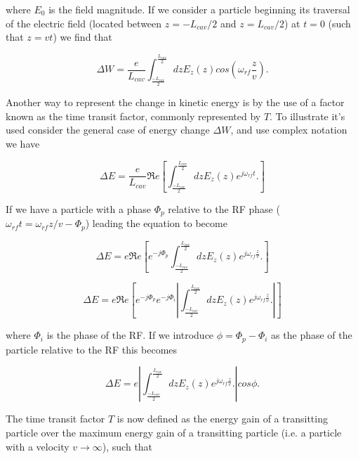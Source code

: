 where $E_{0}$ is the field magnitude. If we consider a particle beginning its traversal of the electric field (located between $z=-L_{cav}/2$ and $z=L_{cav}/2$) at $t=0$ (such that $z=vt$) we find that

\begin{equation}
\Delta W = \frac{e}{L_{cav}} \int^{\frac{L_{cav}}{2}}_{\frac{-L_{cav}}{2}} dz E_{z}\left( z \right) cos \left( \omega_{rf} \frac{z}{v} \right).
\end{equation}

Another way to represent the change in kinetic energy is by the use of a factor known as the time transit factor, commonly represented by $T$. To illustrate it's used consider the general case of energy change $\Delta W$, and use complex notation we have

\begin{equation}
\Delta E = \frac{e}{L_{cav}} \Re{}e \left[ \int^{\frac{L_{cav}}{2}}_{\frac{-L_{cav}}{2}} dz E_{z}\left( z \right)e^{j \omega_{rf} t}.\right]
\end{equation}

If we have a particle with a phase $\Phi_{p}$ relative to the RF phase ($\omega_{rf}t = \omega_{rf}z/v - \Phi_{p}$) leading the equation to become

\begin{equation}
\Delta E = e \Re{}e \left[ e^{-j \Phi_{p}}\int^{\frac{L_{cav}}{2}}_{\frac{-L_{cav}}{2}} dz E_{z}\left( z \right) e^{j \omega_{rf} \frac{z}{v}}.\right]
\end{equation}

\begin{equation}
\Delta E = e \Re{}e \left[ e^{-j \Phi_{p}} e^{-j \Phi_{i}} \left| \int^{\frac{L_{cav}}{2}}_{\frac{-L_{cav}}{2}} dz E_{z}\left( z \right) e^{j \omega_{rf} \frac{z}{v}}.\right| \right]
\end{equation}

where $\Phi_{i}$ is the phase of the RF. If we introduce $\phi = \Phi_{p} - \Phi_{i}$ as the phase of the particle relative to the RF this becomes

\begin{equation}
\Delta E = e  \left| \int^{\frac{L_{cav}}{2}}_{\frac{-L_{cav}}{2}} dz E_{z}\left( z \right) e^{j \omega_{rf} \frac{z}{v}}.\right| cos \phi.
\end{equation}

The time transit factor $T$ is now defined as the energy gain of a transitting particle over the maximum energy gain of a transitting particle (i.e. a particle with a velocity $v \rightarrow \infty $), such that 

